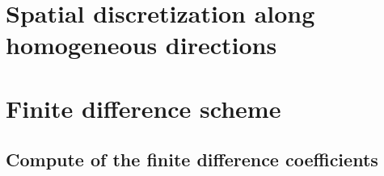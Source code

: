 \section{Spatial discretization along homogeneous directions}


\section{Finite difference scheme}


\subsection{Compute of the finite difference coefficients}